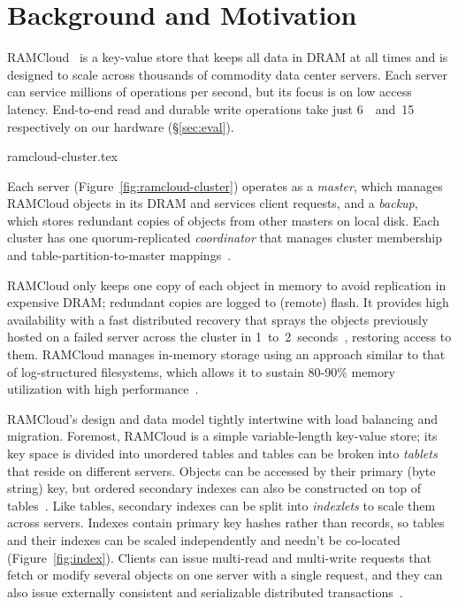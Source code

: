 \section{Background and Motivation}
\label{sec:rmotivation}

RAMCloud~\cite{ramcloud} is a key-value store that keeps all data in
DRAM at all times and is designed to scale across thousands of commodity data
center servers. Each server can service millions of operations per
second, but its focus is on low access latency.  End-to-end read and durable
write operations take just 6~\us~and~15~\us
respectively on our hardware (\S\ref{sec:eval}).

 {ramcloud-cluster.tex}

Each server (Figure~\ref{fig:ramcloud-cluster}) operates as a \emph{master},
which manages RAMCloud objects in its DRAM and services client requests, and a
\emph{backup}, which stores redundant copies of objects from other masters on
local disk.  Each cluster has one quorum-replicated \emph{coordinator} that
manages cluster membership and table-partition-to-master mappings~\cite{ongaro:raft}.

RAMCloud only keeps one copy of each object in memory to avoid replication in
expensive DRAM; redundant copies are logged to (remote) flash.  It provides
high availability with a fast distributed recovery that sprays the objects 
previously hosted on
a failed server across the cluster in
1~to~2~seconds~\cite{ramcloud-recovery}, restoring access to them.
RAMCloud manages
in-memory storage using an approach similar to that of log-structured
filesystems, which allows it to sustain 80-90\% memory utilization
with high performance~\cite{ramcloud-lsm}.

RAMCloud's design and data model tightly intertwine with load balancing and migration.
Foremost, RAMCloud is a simple variable-length key-value store; its key space
is divided into unordered tables and tables can be broken into {\em tablets}
that reside on different servers.  Objects can be accessed by their primary (byte
string) key, but ordered secondary indexes can also be constructed on top of
tables~\cite{ramcloud-slik}. Like tables, secondary indexes can be split into
{\em indexlets} to scale them across servers. Indexes contain primary key hashes
rather than records, so tables and their indexes can be scaled independently
and needn't be co-located (Figure~\ref{fig:index}). Clients can issue multi-read
and multi-write requests that fetch or modify several objects on one server with
a single request, and they can also issue externally consistent and serializable
distributed transactions~\cite{ramcloud-rifl}.

